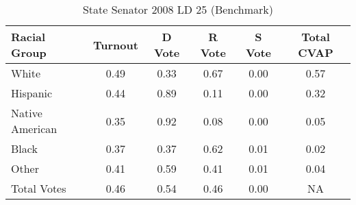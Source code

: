 \begin{table}[htb]
\begin{center}
\caption{State Senator 2008 LD 25 (Benchmark)}
\label{stsen08_cvap_ld_25_benchmark}
\begin{tabular}{lccccc}
  \hline
Racial Group & Turnout & D Vote & R Vote & S Vote & Total CVAP \\ 
  \hline
    White & 0.49  & 0.33  & 0.67  & 0.00  & 0.57 \\
    Hispanic & 0.44  & 0.89  & 0.11  & 0.00  & 0.32 \\
    Native American & 0.35  & 0.92  & 0.08  & 0.00  & 0.05 \\
    Black & 0.37  & 0.37  & 0.62  & 0.01  & 0.02 \\
    Other & 0.41  & 0.59  & 0.41  & 0.01  & 0.04 \\
    Total Votes & 0.46  & 0.54  & 0.46  & 0.00  &  NA \\
   \hline
\end{tabular}
\end{center}
\end{table}